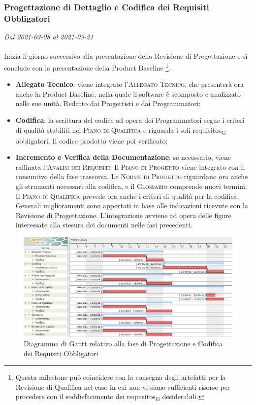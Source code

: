 \subsubsection{Progettazione di Dettaglio e Codifica dei Requisiti Obbligatori}

\textit{Dal 2021-03-08 al 2021-03-21}
\\\\
Inizia il giorno successivo alla presentazione della Revisione di Progettazione e si conclude con la presentazione della Product Baseline \footnote{Questa milestone può coincidere con la consegna degli artefatti per la Revisione di Qualifica nel caso in cui non vi siano sufficienti risorse per procedere con il soddisfacimento dei \glspl{requisito}\textsubscript{G} desiderabili.}.
\begin{itemize}
	\item \textbf{Allegato Tecnico}: viene integrato l'\textsc{Allegato Tecnico}, che presenterà ora anche la Product Baseline, nella quale il software è scomposto e analizzato nelle sue unità. Redatto dai Progettisti e dai Programmatori;
	\item \textbf{Codifica}: la scrittura del codice ad opera dei Programmatori segue i criteri di qualità stabiliti nel \textsc{Piano di Qualifica} e riguarda i soli \glspl{requisito}\textsubscript{G} obbligatori. Il codice prodotto viene poi verificato;
	\item \textbf{Incremento e Verifica della Documentazione}: se necessario, viene raffinata l'\textsc{Analisi dei Requisiti}. Il \textsc{Piano di Progetto} viene integrato con il consuntivo della fase trascorsa.  Le \textsc{Norme di Progetto} riguardano ora anche gli strumenti necessari alla codifica, e il \textsc{Glossario} comprende nuovi termini. Il \textsc{Piano di Qualifica} prevede ora anche i criteri di qualità per la codifica. Generali miglioramenti sono apportati in base alle indicazioni ricevute con la Revisione di Progettazione. L'integrazione avviene ad opera delle figure interessate alla stesura dei documenti nelle fasi precedenti.
	
\end{itemize}


\begin{figure}[H]
	\centering
	\includegraphics[scale=0.52]{res/images/04_gantt_codifica_obbligatori.png}
	\caption{Diagramma di Gantt relativo alla fase di Progettazione  e Codifica dei Requisiti Obbligatori}
\end{figure}



